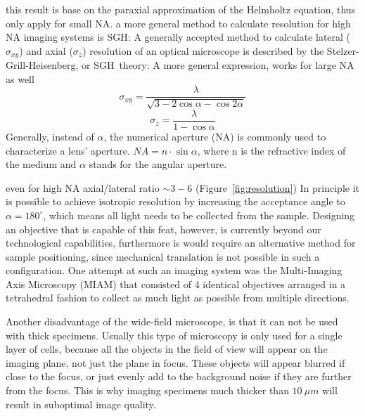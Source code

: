 \documentclass{diploma_style}
\begin{document}
this result is base on the paraxial approximation of the Helmholtz equation, thus only apply for small NA.
a more general method to calculate resolution for high NA imaging systems is SGH:
A generally accepted method to calculate lateral ($\sigma_{xy}$) and axial ($\sigma_{z}$) resolution of an optical microscope is described by the Stelzer-Grill-Heisenberg, or SGH~theory\cite{grill_method_1999, stelzer_uncertainty_2000}:
A more general expression, works for large NA as well
\begin{equation} \label{eq:latres}
\sigma_{xy}=\frac{\lambda}{\sqrt{3-2 \cos \alpha - \cos 2 \alpha}}
\end{equation}
\begin{equation} \label{eq:axres}
\sigma_z = \frac{\lambda}{1-\cos \alpha}
\end{equation}
Generally, instead of $\alpha$, the numerical aperture (NA) is commonly used to characterize a lens' aperture. 
$NA=n\cdot \sin \alpha$, where n is the refractive index of the medium and $\alpha$ stands for the angular aperture.

even for high NA axial/lateral ratio $\sim 3-6$ (Figure~\ref{fig:resolution})
In principle it is possible to achieve isotropic resolution by increasing the acceptance angle to $\alpha = 180^\circ$, which means all light needs to be collected from the sample. Designing an objective that is capable of this feat, however, is currently beyond our technological capabilities, furthermore is would require an alternative method for sample positioning, since mechanical translation is not possible in such a configuration. One attempt at such an imaging system was the Multi-Imaging Axis Microscopy (MIAM) \cite{swoger_multiple_2003,swoger_multi-view_2007} that consisted of 4 identical objectives arranged in a tetrahedral fashion to collect as much light as possible from multiple directions. 

Another disadvantage of the wide-field microscope, is that it can not be used with thick specimens. Usually this type of microscopy is only used for a single layer of cells, because all the objects in the field of view will appear on the imaging plane, not just the plane in focus. These objects will appear blurred if close to the focus, or just evenly add to the background noise if they are further from the focus. This is why imaging specimens much thicker than $10\ \mu m$ will result in suboptimal image quality.
\end{document}
